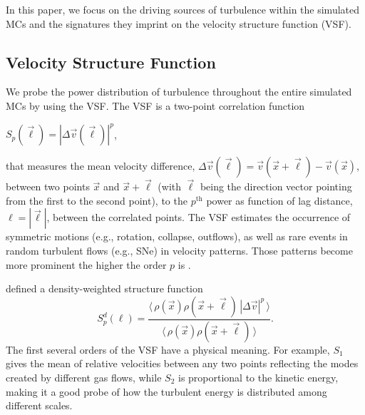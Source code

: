 In this paper, we focus on the driving sources of turbulence within the simulated MCs and the signatures they imprint on 
the velocity structure function (VSF).


\subsection{Velocity Structure Function}\label{methods:vsf}

We probe the power distribution of turbulence throughout the entire simulated MCs by using the VSF.
The VSF is a two-point correlation function 
\begin{definition}
	$\mathit{S}_p (\vec{\ell}) = |\Delta \vec{v} (\vec{\ell})|^p $,
    \label{equ:method:def_vsf}
\end{definition}
that measures the mean velocity difference, $\Delta \vec{v} (\vec{\ell}) = \vec{v}(\vec{x}+\vec{\ell}) - \vec{v}(\vec{x})$, between two points $\vec{x}$ and $\vec{x}+\vec{\ell}$ (with $\vec{\ell}$ being the direction vector pointing from the first to the second point), to the $p^\mathrm{th}$ power as function of lag distance, $\ell = |\vec{\ell}|$, between the correlated points.
The VSF estimates the occurrence of symmetric motions (e.g., rotation, collapse, outflows), as well as rare events in random turbulent flows (e.g., SNe) in velocity patterns.
Those patterns become more prominent the higher the order $p$ is \citep{Heyer2004}.

\citet{Padoan2016a} defined a density-weighted structure function
\begin{equation}
	\mathit{S}^d_p (\ell) = \frac{\langle \, \rho(\vec{x}) \rho(\vec{x}+\vec{\ell}) \, |\Delta \vec{v}|^p  \, \rangle}{\langle  \, \rho(\vec{x}) \rho(\vec{x}+\vec{\ell}) \, \rangle}.
    \label{equ:method:def_vsf_dw}
\end{equation}
          The first several orders of the VSF have 
a physical meaning. 
For example, $\mathit{S}_1$
     gives the mean of relative velocities between any two points 
reflecting the modes created by different gas flows, while
$\mathit{S}_2$ is proportional to the kinetic energy, making it a good probe of how the turbulent energy is
    distributed among 
different scales.

